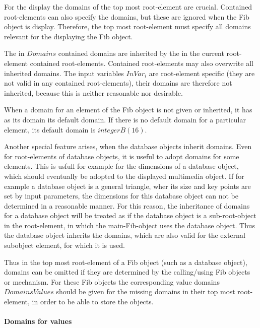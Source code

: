 For the display the domains of the top most root-element are crucial. Contained root-elements can also specify the domains, but these are ignored when the Fib object is display. Therefore, the top most root-element must specify all domains relevant for the displaying the Fib object.

The in $Domains$ contained domains are inherited by the in the current root-element contained root-elements. Contained root-elements may also overwrite all inherited domains. The input variables $InVar_i$ are root-element specific (they are not valid in any contained root-elements), their domains are therefore not inherited, because this is neither reasonable nor desirable.

When a domain for an element of the Fib object is not given or inherited, it has as its domain its default domain. If there is no default domain for a particular element, its default domain is $integerB(16)$.

Another special feature arises, when the database objects inherit domains. Even for root-elements of database objects, it is useful to adopt domains for some elements. This is usfull for example for the dimensions of a database object, which should eventually be adopted to the displayed multimedia object. If for example a database object is a general triangle, wher its size and key points are set by input parameters, the dimensions for this database object can not be determined in a reasonable manner. For this reason, the inheritance of domains for a database object will be treated as if the database object is a sub-root-object in the root-element, in which the main-Fib-object uses the database object. Thus the database object inherits the domains, which are also valid for the external subobject element, for which it is used.

Thus in the top most root-element of a Fib object (such as a database object), domains can be omitted if they are determined by the calling/using Fib objects or mechanism. For these Fib objects the corresponding value domains $DomainsValues$ should be given for the missing domains in their top most root-element, in order to be able to store the objects.


\paragraph{Domains for values}
\label{secDomainsForValues}

